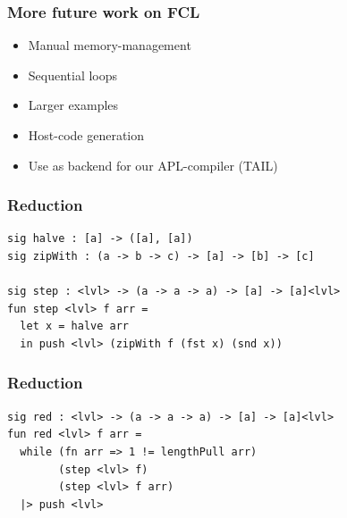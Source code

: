 \documentclass{beamer}
\begin{document}
\appendix
\backupbegin

\begin{frame}
  \frametitle{More future work on FCL}

  \begin{itemize}
  \item Manual memory-management
  \item Sequential loops
  \item Larger examples
  \item Host-code generation
  \item Use as backend for our APL-compiler (TAIL)
  \end{itemize}
\end{frame}

\begin{frame}[fragile]
  \frametitle{Reduction}
\begin{verbatim}
sig halve : [a] -> ([a], [a])
sig zipWith : (a -> b -> c) -> [a] -> [b] -> [c]

sig step : <lvl> -> (a -> a -> a) -> [a] -> [a]<lvl>
fun step <lvl> f arr =
  let x = halve arr
  in push <lvl> (zipWith f (fst x) (snd x))
\end{verbatim}



\end{frame}

\begin{frame}[fragile]
  \frametitle{Reduction}
  \begin{verbatim}
sig red : <lvl> -> (a -> a -> a) -> [a] -> [a]<lvl>
fun red <lvl> f arr =
  while (fn arr => 1 != lengthPull arr)
        (step <lvl> f)
        (step <lvl> f arr)
  |> push <lvl>
\end{verbatim}
\end{frame}
\end{document}
